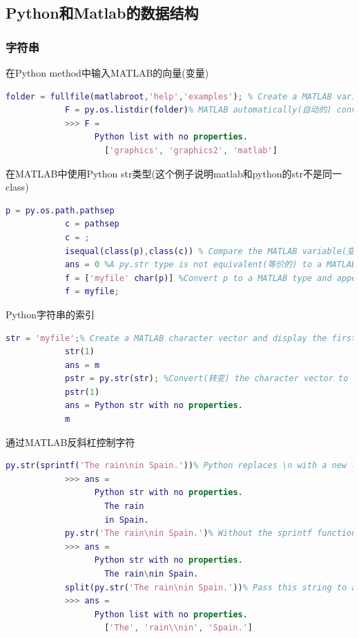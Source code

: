     \subsection{Python和Matlab的数据结构}
        \subsubsection{字符串}
            \par
            在Python method中输入MATLAB的向量(变量)
            \begin{lstlisting}[language = Matlab]
            folder = fullfile(matlabroot,'help','examples'); % Create a MATLAB variable(变量) .
            F = py.os.listdir(folder)% MATLAB automatically(自动的) converts(转换) folder to the Python str type.
            >>> F =
                  Python list with no properties.
                    ['graphics', 'graphics2', 'matlab']
            \end{lstlisting}
            在MATLAB中使用Python str类型(这个例子说明matlab和python的str不是同一class)
            \begin{lstlisting}[language = Matlab]
            p = py.os.path.pathsep
            c = pathsep
            c = ;
            isequal(class(p),class(c)) % Compare the MATLAB variable(变量的) type to the Python type.
            ans = 0 %A py.str type is not equivalent(等价的) to a MATLAB char type.
            f = ['myfile' char(p)] %Convert p to a MATLAB type and append(附加) the character to a file name.
            f = myfile;
            \end{lstlisting}
            Python字符串的索引
            \begin{lstlisting}[language = Matlab]
            str = 'myfile';% Create a MATLAB character vector and display the first character.
            str(1)
            ans = m
            pstr = py.str(str); %Convert(转变) the character vector to a Python str type and display the first character.
            pstr(1)
            ans = Python str with no properties.
            m
            \end{lstlisting}
            通过MATLAB反斜杠控制字符
            \begin{lstlisting}[language = Matlab]
            py.str(sprintf('The rain\nin Spain.'))% Python replaces \n with a new line.
            >>> ans =
                  Python str with no properties.
                    The rain
                    in Spain.
            py.str('The rain\nin Spain.')% Without the sprintf function, both MATLAB and Python interpret(说明) \ as a literal(文字的) backslash(反斜杠).
            >>> ans =
                  Python str with no properties.
                    The rain\nin Spain.
            split(py.str('The rain\nin Spain.'))% Pass this string to a Python string method, split.
            >>> ans =
                  Python list with no properties.
                    ['The', 'rain\\nin', 'Spain.']
            \end{lstlisting}

